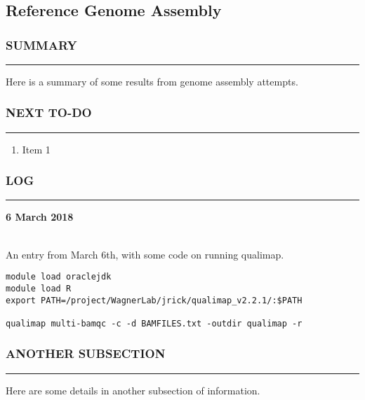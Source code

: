 \clearpage
\chapter{}
\section{Reference Genome Assembly}

\subsection*{SUMMARY}
\hrule
Here is a summary of some results from genome assembly attempts.


\subsection*{NEXT TO-DO}
\hrule

\begin{enumerate}
\item Item 1
\end{enumerate}
\subsection*{LOG}
\hrule
\hrulefill
\begin{large} \textbf{6 March 2018} \end{large} \\
An entry from March 6th, with some code on running qualimap.

\begin{verbatim}
module load oraclejdk
module load R
export PATH=/project/WagnerLab/jrick/qualimap_v2.2.1/:$PATH

qualimap multi-bamqc -c -d BAMFILES.txt -outdir qualimap -r
\end{verbatim}

\subsection*{ANOTHER SUBSECTION}
\hrule
Here are some details in another subsection of information.


